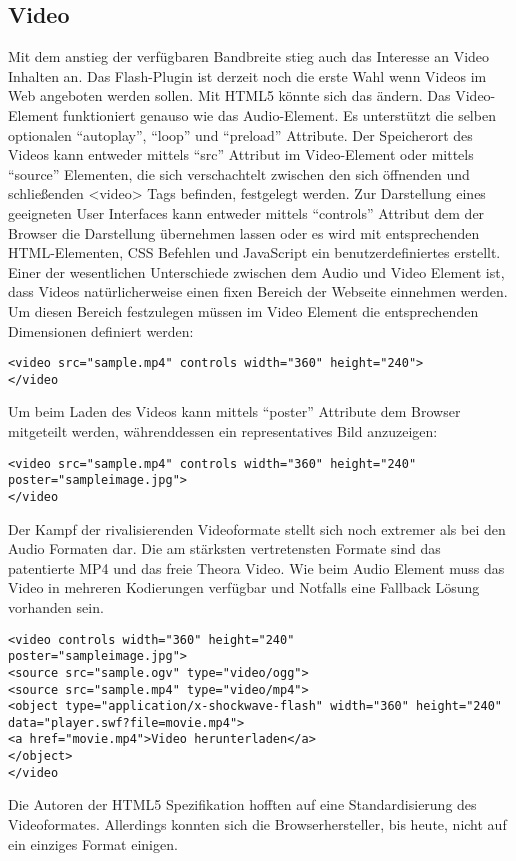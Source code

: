\subsection{Video}
Mit dem anstieg der verfügbaren Bandbreite stieg auch das Interesse an Video Inhalten an.
Das Flash-Plugin ist derzeit noch die erste Wahl wenn Videos im Web angeboten werden sollen.
Mit HTML5 könnte sich das ändern.
\newline\newline
Das Video-Element funktioniert genauso wie das Audio-Element. Es unterstützt die
selben optionalen ``autoplay'', ``loop'' und ``preload'' Attribute. Der Speicherort des Videos
kann entweder mittels ``src'' Attribut im Video-Element oder mittels ``source'' Elementen, die
sich verschachtelt zwischen den sich öffnenden und schließenden <video> Tags befinden,
festgelegt werden. Zur Darstellung eines geeigneten User Interfaces kann entweder mittels
``controls'' Attribut dem der Browser die Darstellung übernehmen lassen oder es wird mit
entsprechenden HTML-Elementen, CSS Befehlen und JavaScript ein benutzerdefiniertes erstellt.
\newline\newline
Einer der wesentlichen Unterschiede zwischen dem Audio und Video Element ist, dass Videos
natürlicherweise einen fixen Bereich der Webseite einnehmen werden. Um diesen
Bereich festzulegen müssen im Video Element die entsprechenden Dimensionen definiert werden:
\begin{verbatim}
<video src="sample.mp4" controls width="360" height="240">
</video
\end{verbatim}
Um beim Laden des Videos kann mittels ``poster'' Attribute dem Browser mitgeteilt werden,
währenddessen ein representatives Bild anzuzeigen:
\begin{verbatim}
<video src="sample.mp4" controls width="360" height="240"
poster="sampleimage.jpg">
</video
\end{verbatim}
Der Kampf der rivalisierenden Videoformate stellt sich noch extremer als bei den Audio Formaten dar.
Die am stärksten vertretensten Formate sind das patentierte MP4 und das freie Theora Video. Wie beim
Audio Element muss das Video in mehreren Kodierungen verfügbar und Notfalls eine Fallback Lösung
vorhanden sein.
\begin{verbatim}
<video controls width="360" height="240"
poster="sampleimage.jpg">
<source src="sample.ogv" type="video/ogg">
<source src="sample.mp4" type="video/mp4">
<object type="application/x-shockwave-flash" width="360" height="240"
data="player.swf?file=movie.mp4">
<a href="movie.mp4">Video herunterladen</a>
</object>
</video
\end{verbatim}
Die Autoren der HTML5 Spezifikation hofften auf eine Standardisierung des Videoformates. Allerdings
konnten sich die Browserhersteller, bis heute, nicht auf ein einziges Format einigen.

